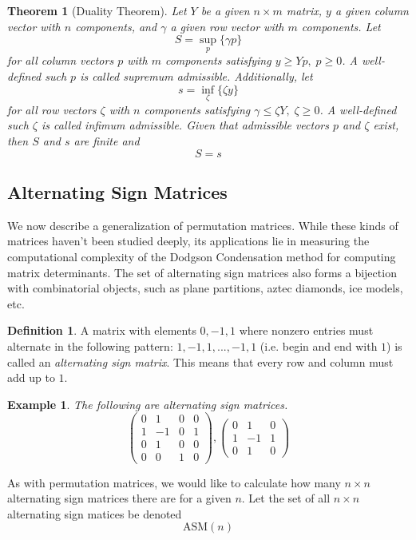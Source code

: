\documentclass{article}
\newtheorem{theorem}{Theorem}[section]
\newtheorem{example}{Example}[section]
\theoremstyle{remark}
\theoremstyle{definition}
\newtheorem{definition}{Definition}[section]
\begin{document}
\begin{theorem}[Duality Theorem]
Let $Y$ be a given $n \times m$ matrix, $y$ a given column vector with $n$ components, and $\gamma$ a given row vector with $m$ components. Let 
\[S = \sup_p \{\gamma p\}\]
for all column vectors $p$ with $m$ components satisfying $y \geq Y p, \; p \geq 0$. A well-defined such $p$ is called \textit{supremum admissible}. Additionally, let 
\[s = \inf_\zeta \{ \zeta y\}\]
for all row vectors $\zeta$ with $n$ components satisfying $\gamma \leq \zeta Y, \; \zeta \geq 0$. A well-defined such $\zeta$ is called \textit{infimum admissible}. Given that admissible vectors $p$ and $\zeta$ exist, then $S$ and $s$ are finite and 
\[S = s\]
\end{theorem}

\subsection{Alternating Sign Matrices}
We now describe a generalization of permutation matrices. While these kinds of matrices haven't been studied deeply, its applications lie in measuring the computational complexity of the Dodgson Condensation method for computing matrix determinants. The set of alternating sign matrices also forms a bijection with combinatorial objects, such as plane partitions, aztec diamonds, ice models, etc. 

\begin{definition}
A matrix with elements $0, -1, 1$ where nonzero entries must alternate in the following pattern: $1, -1, 1, ..., -1, 1$ (i.e. begin and end with $1$) is called an \textit{alternating sign matrix}. This means that every row and column must add up to $1$. 
\end{definition}

\begin{example}
The following are alternating sign matrices. 
\[\begin{pmatrix}
0&1&0&0\\1&-1&0&1\\0&1&0&0\\0&0&1&0
\end{pmatrix}, \begin{pmatrix}
0&1&0\\1&-1&1\\0&1&0
\end{pmatrix}\]
\end{example}

As with permutation matrices, we would like to calculate how many $n \times n$ alternating sign matrices there are for a given $n$. Let the set of all $n \times n$ alternating sign matices be denoted
\[\text{ASM}(n)\]
\end{document}
